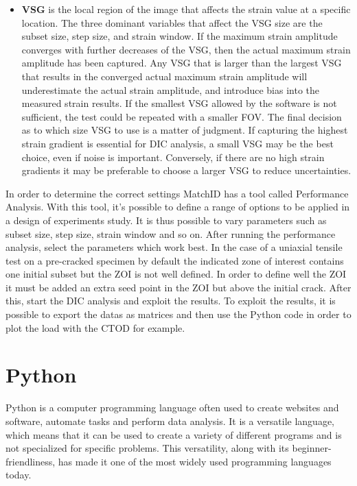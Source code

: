 \begin{itemize}
	\item \textbf{VSG} is the local region of the image that affects the strain value at a specific location. The three dominant variables that affect the VSG size are the subset size, step size, and strain window. If the maximum strain amplitude converges with further decreases of the VSG, then the actual maximum strain amplitude has been captured. Any VSG that is larger than the largest VSG that results in the converged actual maximum strain amplitude will underestimate the actual strain amplitude, and introduce bias into the measured strain results. If the smallest VSG allowed by the software is not sufficient, the test could be repeated with a smaller FOV. The final decision as to which size VSG to use is a matter of judgment. If capturing the highest strain gradient is essential for DIC analysis, a small VSG may be the best choice, even if noise is important. Conversely, if there are no high strain gradients it may be preferable to choose a larger VSG to reduce uncertainties.
\end{itemize}

In order to determine the correct settings MatchID has a tool called Performance Analysis. With this tool, it’s possible to define a range of options to be applied in a design of experiments study. It is thus possible to vary parameters such as subset size, step size, strain window and so on. After running the performance analysis, select the parameters which work best. 
In the case of a uniaxial tensile test on a pre-cracked specimen by default the indicated zone of interest contains one initial subset but the ZOI is not well defined. In order to define well the ZOI it must be added an extra seed point in the ZOI but above the initial crack. After this, start the DIC analysis and exploit the results. To exploit the results, it is possible to export the datas as matrices and then use the Python code in order to plot the load with the CTOD for example.



\section{Python}

Python is a computer programming language often used to create websites and software, automate tasks and perform data analysis. It is a versatile language, which means that it can be used to create a variety of different programs and is not specialized for specific problems. This versatility, along with its beginner-friendliness, has made it one of the most widely used programming languages today.


